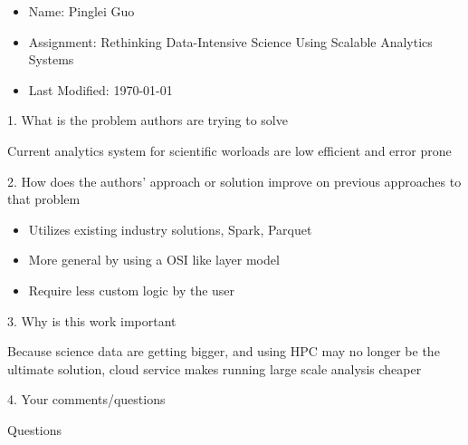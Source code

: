 \documentclass[12pt,a4paper,oneside]{article}
\begin{document}
\begin{itemize}
  \item Name: Pinglei Guo
  \item Assignment: Rethinking Data-Intensive Science Using Scalable Analytics Systems
  \item Last Modified: \today
\end{itemize}

1. What is the problem authors are trying to solve

\medskip

Current analytics system for scientific worloads are low efficient and error prone

\bigskip

2. How does the authors’ approach or solution improve on previous approaches to that problem

\medskip

\begin{itemize}
  \item Utilizes existing industry solutions, Spark, Parquet
  \item More general by using a OSI like layer model
  \item Require less custom logic by the user
\end{itemize}

\bigskip

3. Why is this work important

\medskip

Because science data are getting bigger, and using HPC may no longer be the ultimate solution,
cloud service makes running large scale analysis cheaper

\bigskip

4. Your comments/questions

\medskip

Questions
\end{document}

